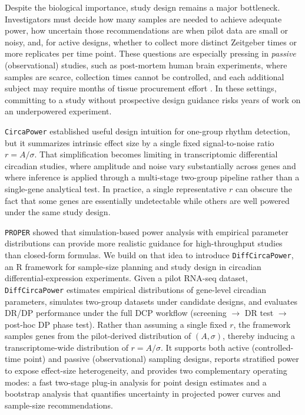 \documentclass{article}
\newcommand{\software}[1]{\texttt{#1}}
\begin{document}
Despite the biological importance, study design remains a major bottleneck. Investigators must decide how many samples are needed to achieve adequate power, how uncertain those recommendations are when pilot data are small or noisy, and, for active designs, whether to collect more distinct Zeitgeber times or more replicates per time point. These questions are especially pressing in \emph{passive} (observational) studies, such as post-mortem human brain experiments, where samples are scarce, collection times cannot be controlled, and each additional subject may require months of tissue procurement effort \cite{zong2023circapower}. In these settings, committing to a study without prospective design guidance risks years of work on an underpowered experiment.

\software{CircaPower} \cite{zong2023circapower} established useful design intuition for one-group rhythm detection, but it summarizes intrinsic effect size by a single fixed signal-to-noise ratio $r=A/\sigma$. That simplification becomes limiting in transcriptomic differential circadian studies, where amplitude and noise vary substantially across genes and where inference is applied through a multi-stage two-group pipeline rather than a single-gene analytical test. In practice, a single representative $r$ can obscure the fact that some genes are essentially undetectable while others are well powered under the same study design.

\software{PROPER} \cite{wu2015proper} showed that simulation-based power analysis with empirical parameter distributions can provide more realistic guidance for high-throughput studies than closed-form formulas. We build on that idea to introduce \software{DiffCircaPower}, an R framework for sample-size planning and study design in circadian differential-expression experiments. Given a pilot RNA-seq dataset, \software{DiffCircaPower} estimates empirical distributions of gene-level circadian parameters, simulates two-group datasets under candidate designs, and evaluates DR/DP performance under the full DCP workflow (screening $\rightarrow$ DR test $\rightarrow$ post-hoc DP phase test). Rather than assuming a single fixed $r$, the framework samples genes from the pilot-derived distribution of $(A,\sigma)$, thereby inducing a transcriptome-wide distribution of $r=A/\sigma$. It supports both active (controlled-time point) and passive (observational) sampling designs, reports stratified power to expose effect-size heterogeneity, and provides two complementary operating modes: a fast two-stage plug-in analysis for point design estimates and a bootstrap analysis that quantifies uncertainty in projected power curves and sample-size recommendations.
\end{document}
